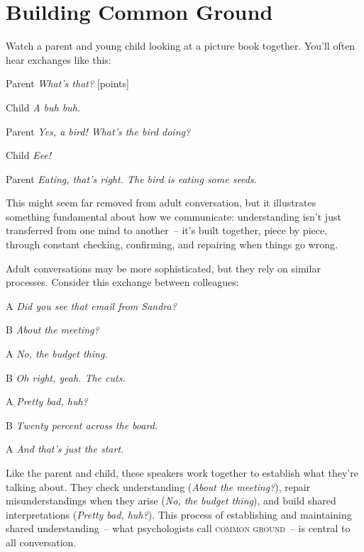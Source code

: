 \section{Building Common Ground} \label{sec:common-ground}

Watch a parent and young child looking at a picture book together. You'll often hear exchanges like this:

\ea
\begin{dialogue}
\item[Parent] \textit{What's that?} [points]
\item[Child] \textit{A buh buh.}
\item[Parent] \textit{Yes, a bird! What's the bird doing?}
\item[Child] \textit{Eee!}
\item[Parent] \textit{Eating, that's right. The bird is eating some seeds.}
\end{dialogue}
\z

This might seem far removed from adult conversation, but it illustrates something fundamental about how we communicate: understanding isn't just transferred from one mind to another~-- it's built together, piece by piece, through constant checking, confirming, and repairing when things go wrong.

Adult conversations may be more sophisticated, but they rely on similar processes. Consider this exchange between colleagues:

\ea
\begin{dialogue}
\item[A] \textit{Did you see that email from Sandra?}
\item[B] \textit{About the meeting?}
\item[A] \textit{No, the budget thing.}
\item[B] \textit{Oh right, yeah. The cuts.}
\item[A] \textit{Pretty bad, huh?}
\item[B] \textit{Twenty percent across the board.}
\item[A] \textit{And that's just the start.}
\end{dialogue}
\z

Like the parent and child, these speakers work together to establish what they're talking about. They check understanding (\textit{About the meeting?}), repair misunderstandings when they arise (\textit{No, the budget thing}), and build shared interpretations (\textit{Pretty bad, huh?}). This process of establishing and maintaining shared understanding~-- what psychologists call \textsc{common ground}~-- is central to all conversation.


